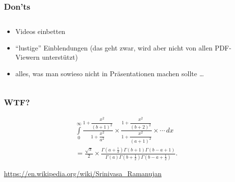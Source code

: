 \documentclass{beamer}
\begin{document}
\begin{frame}
  \frametitle{Don'ts}

  \begin{columns}
    \begin{column}{0.45\linewidth}

  \begin{itemize}
  \item<+-> Videos einbetten
  \item<+-> \enquote{lustige} Einblendungen (das geht zwar, wird aber nicht von
    allen PDF-Viewern unterstützt)
  \item<+-> alles, was man sowieso nicht in Präsentationen machen sollte \ldots
  \end{itemize}

    \end{column}
    \begin{column}{0.45\linewidth}
    \end{column}
  \end{columns}

\end{frame}

\begin{frame}[fragile]
  \frametitle{WTF?}

  \onslide<+->

  \begin{multline*}
    \int \limits _{0}^{\infty }{\frac {1+{\dfrac {x^{2}}{(b+1)^{2}}}}{1+{\dfrac
          {x^{2}}{a^{2}}}}}\times {\frac {1+{\dfrac
          {x^{2}}{(b+2)^{2}}}}{1+{\dfrac {x^{2}}{(a+1)^{2}}}}}\times \cdots \,dx \\
    = {\frac {\sqrt {\pi }}{2}}\times {\frac {\Gamma \left(a+{\frac
            {1}{2}}\right)\Gamma (b+1)\Gamma (b-a+1)}{\Gamma (a)\Gamma
        \left(b+{\frac {1}{2}}\right)\Gamma \left(b-a+{\frac {1}{2}}\right)}}.
  \end{multline*}

  \bigskip

  {\tiny \url{https://en.wikipedia.org/wiki/Srinivasa_Ramanujan}}

  \onslide<+->


\end{frame}
\end{document}
